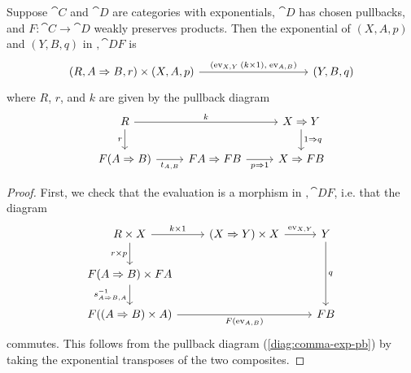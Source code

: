 \begin{lem}
Suppose $\cat{C}$ and $\cat{D}$ are categories with exponentials, $\cat{D}$ has chosen pullbacks, and $F : \cat{C} \to \cat{D}$ weakly preserves products. Then the exponential of $(X, A, p)$ and $(Y, B, q)$ in $\comma{\cat{D}}{F}$ is
\[\begin{tikzcd}
	{\cprod{(R, \cexp{A}{B}, r)}{(X, A, p)}} &&&& {(Y, B, q)}
	\arrow["{(\mev[X,Y]\:(\cprod{k}{\id}),\;\mev[A,B])}", from=1-1, to=1-5]
\end{tikzcd}\]
where $R$, $r$, and $k$ are given by the pullback diagram
\begin{equation} \label{diag:comma-exp-pb}
\begin{tikzcd}
	R && {\cexp{X}{Y}} \\
	{F(\cexp{A}{B})} & {\cexp{FA}{FB}} & {\cexp{X}{FB}}
	\arrow["{\expcmp[A,B]}"', from=2-1, to=2-2]
	\arrow["{\cexp{p}{\id}}"', from=2-2, to=2-3]
	\arrow["{\cexp{\id}{q}}", from=1-3, to=2-3]
	\arrow["r"', from=1-1, to=2-1]
	\arrow["k", from=1-1, to=1-3]
\end{tikzcd}
\end{equation}
\begin{proof}
First, we check that the evaluation is a morphism in $\comma{\cat{D}}{F}$, i.e. that the diagram
\[\begin{tikzcd}
	{\cprod{R}{X}} & {\cprod{(\cexp{X}{Y})}{X}} & Y \\
	{\cprod{F(\cexp{A}{B})}{FA}} \\
	{F(\cprod{(\cexp{A}{B})}{A})} && FB
	\arrow["{\cprod{k}{\id}}", from=1-1, to=1-2]
	\arrow["{\mev[X,Y]}", from=1-2, to=1-3]
	\arrow["{\cprod{r}{p}}"', from=1-1, to=2-1]
	\arrow["{\inv{\prodcmp[\cexp{A}{B},A]}}"', from=2-1, to=3-1]
	\arrow["q", from=1-3, to=3-3]
	\arrow["{F(\mev[A,B])}"', from=3-1, to=3-3]
\end{tikzcd}\]
commutes.
This follows from the pullback diagram (\ref{diag:comma-exp-pb}) by taking the exponential transposes of the two composites.


\end{proof}
\end{lem}
